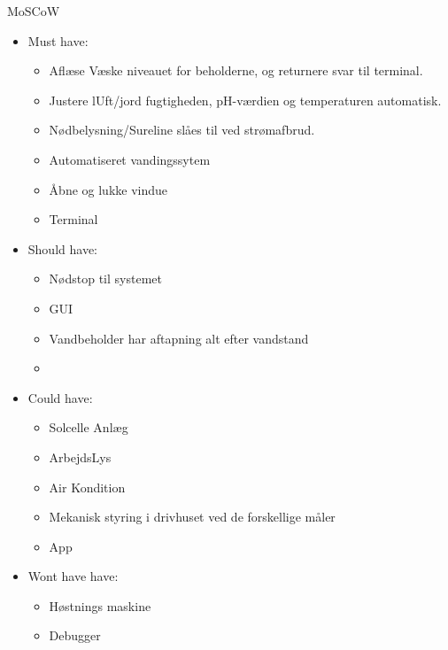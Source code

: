 \documentclass[a4paper,oneside,article]{memoir}
\begin{document}
MoSCoW

\begin{itemize}
	\item Must have:
	\begin{itemize}
		\item Aflæse Væske niveauet for beholderne, og returnere svar til terminal.
		\item Justere lUft/jord fugtigheden, pH-værdien og temperaturen automatisk.
		\item Nødbelysning/Sureline slåes til ved strømafbrud. 
		\item Automatiseret vandingssytem
		\item Åbne og lukke vindue
		\item Terminal
	\end{itemize}
\end{itemize}

\begin{itemize}
	\item Should have:
	\begin{itemize}
		\item Nødstop til systemet
		\item GUI
		\item Vandbeholder har aftapning alt efter vandstand
		\item 
	\end{itemize}
\end{itemize}

\begin{itemize}
	\item Could have: 
	\begin{itemize}
		\item Solcelle Anlæg
		\item ArbejdsLys
		\item Air Kondition
		\item Mekanisk styring i drivhuset ved de forskellige måler
			\item App 
	\end{itemize}
\end{itemize}



\begin{itemize}
	\item Wont have have:
	\begin{itemize}
		\item Høstnings maskine 
		\item Debugger
	\end{itemize}
\end{itemize}
\end{document}
